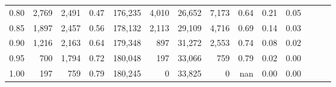 \begin{tabular}{rrrrrrrrrrrrrr}
0.80 &   2,769 &  2,491 &  0.47 &  176,235 &    4,010 &  26,652 &   7,173 &  0.64 &  0.21 &      0.05 \\
0.85 &   1,897 &  2,457 &  0.56 &  178,132 &    2,113 &  29,109 &   4,716 &  0.69 &  0.14 &      0.03 \\
0.90 &   1,216 &  2,163 &  0.64 &  179,348 &      897 &  31,272 &   2,553 &  0.74 &  0.08 &      0.02 \\
0.95 &     700 &  1,794 &  0.72 &  180,048 &      197 &  33,066 &     759 &  0.79 &  0.02 &      0.00 \\
1.00 &     197 &    759 &  0.79 &  180,245 &        0 &  33,825 &       0 &   nan &  0.00 &      0.00 \\
\bottomrule
\end{tabular}
